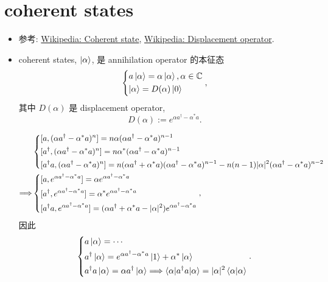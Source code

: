 \documentclass[10pt, a4paper]{article}
\numberwithin{equation}{section}
\begin{document}
	\section{coherent states}
	\begin{itemize}
		\item 参考: \href{https://en.wikipedia.org/wiki/Coherent_state}{Wikipedia: Coherent state}, \href{https://en.wikipedia.org/wiki/Displacement_operator}{Wikipedia: Displacement operator}.
		
		\item coherent states, $\ket{\alpha}$, 是 annihilation operator 的本征态
		\begin{equation}
			\begin{dcases}
				a \ket{\alpha} = \alpha \ket{\alpha}, \alpha \in \mathbb{C} \\
				\ket{\alpha} = D(\alpha) \ket{0}
			\end{dcases},
		\end{equation}
		其中 $D(\alpha)$ 是 displacement operator,
		\begin{equation}
			D(\alpha) := e^{\alpha a^\dag - \alpha^* a}.
		\end{equation}
		
		\begin{tcolorbox}[title=calculation:]
			\begin{align}
				& \begin{dcases}
					[a, (\alpha a^\dag - \alpha^* a)^n] = n \alpha (\alpha a^\dag - \alpha^* a)^{n - 1} \\
					[a^\dag, (\alpha a^\dag - \alpha^* a)^n] = n \alpha^* (\alpha a^\dag - \alpha^* a)^{n - 1} \\
					[a^\dag a, (\alpha a^\dag - \alpha^* a)^n] = n (\alpha a^\dag + \alpha^* a) (\alpha a^\dag - \alpha^* a)^{n - 1} - n (n - 1) |\alpha|^2 (\alpha a^\dag - \alpha^* a)^{n - 2}
				\end{dcases} \notag \\
				\Longrightarrow & \begin{dcases}
					[a, e^{\alpha a^\dag - \alpha^* a}] = \alpha e^{\alpha a^\dag - \alpha^* a} \\
					[a^\dag, e^{\alpha a^\dag - \alpha^* a}] = \alpha^* e^{\alpha a^\dag - \alpha^* a} \\
					[a^\dag a, e^{\alpha a^\dag - \alpha^* a}] = (\alpha a^\dag + \alpha^* a - |\alpha|^2) e^{\alpha a^\dag - \alpha^* a}
				\end{dcases},
			\end{align}
			因此
			\begin{equation} \label{A.4}
				\begin{dcases}
					a \ket{\alpha} = \cdots \\
					a^\dag \ket{\alpha} = e^{\alpha a^\dag - \alpha^* a} \ket{1} + \alpha^* \ket{\alpha} \\
					a^\dag a \ket{\alpha} = \alpha a^\dag \ket{\alpha} \Longrightarrow \braket{\alpha | a^\dag a | \alpha} = |\alpha|^2 \braket{\alpha | \alpha}
				\end{dcases}.
			\end{equation}
		\end{tcolorbox}
		

\end{itemize}
\end{document}
